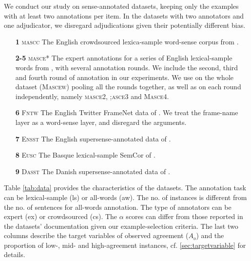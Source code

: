 \documentclass[11pt,a4paper]{article}
\begin{document}
We conduct our study on sense-annotated datasets, keeping only the examples with at least two annotations per item. 
In the datasets with two annotators and one adjudicator, we disregard adjudications given their potentially different bias.

\begin{itemize}[nolistsep,noitemsep]
\item[\textbf{1}] \textsc{mascc} The English crowdsourced lexica-sample word-sense corpus from .
\item[\textbf{2-5}] \textsc{masce*} The expert annotations for a series of English lexical-sample words from , with several annotation rounds. We include the second, third and fourth round of annotation in our experiments. We use on the whole dataset (\textsc{Mascew}) pooling all the rounds together, as well as on each round independently, namely \textsc{masce2}, \textsc{;asce3} and \textsc{Masce4}.
\item[\textbf{6}] \textsc{Fntw} The English Twitter FrameNet data of . We treat the frame-name layer as a word-sense layer, and disregard the arguments.
\item[\textbf{7}] \textsc{Ensst} The English supersense-annotated data of .
\item[\textbf{8}] \textsc{Eusc} The Basque lexical-sample SemCor of .
\item[\textbf{9}] \textsc{Dasst} The Danish supersense-annotated  data of .
\end{itemize}
Table \ref{tab:data} provides the characteristics of the datasets. The annotation task can be lexical-sample (ls) or all-words (aw). The no. of instances is different from the no. of sentences for all-words annotation. The type of annotators can be expert (ex) or crowdsourced (cs). The $\alpha$ scores can differ from those reported in the datasets' documentation given our example-selection criteria. The last two columns describe the target variables of observed agreement ($A_o$) and the proportion of low-, mid- and high-agreement instances, cf. \ref{sec:targetvariable} for details.
\end{document}
